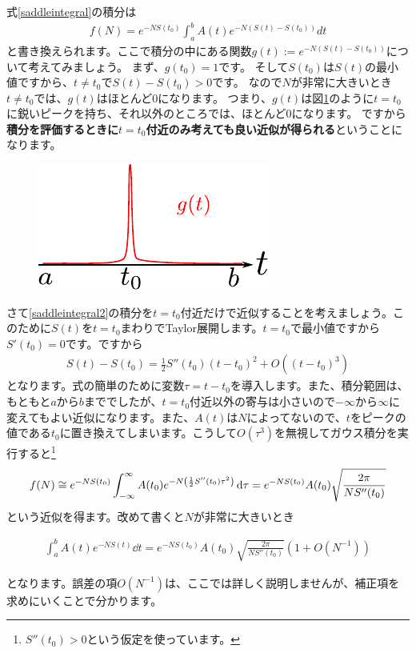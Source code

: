 \documentclass[report,paper=a4, fontsize=12pt, line_length=16cm, number_of_lines=33,dvipdfmx]{jlreq}
\newenvironment{important}{\begin{tcolorbox}[
  colback = white,
  colframe = red!35,
  boxrule = 2mm,
  fonttitle = \bfseries,
  after = \noindent] }{\end{tcolorbox}}
\numberwithin{equation}{section}
\newcommand{\strong}[1]{\textsf{\bfseries #1}}
\begin{document}
式\eqref{saddleintegral}の積分は
\begin{align}
  f(N)=e^{-NS(t_0)}\int_{a}^{b}A(t)e^{-N (S(t)-S(t_0))}dt\label{saddleintegral2}
\end{align}
と書き換えられます。ここで積分の中にある関数$g(t):=e^{-N (S(t)-S(t_0))}$について考えてみましょう。
まず、$g(t_0)=1$です。
そして$S(t_0)$は$S(t)$の最小値ですから、$t\ne t_0$で$S(t)-S(t_0)>0$です。
なので$N$が非常に大きいとき$t\ne t_0$では、$g(t)$はほとんど$0$になります。
つまり、$g(t)$は図\ref{fig:saddlefunction2}のように$t=t_0$に鋭いピークを持ち、それ以外のところでは、ほとんど$0$になります。
ですから\strong{積分を評価するときに$t=t_0$付近のみ考えても良い近似が得られる}ということになります。
\begin{figure}[htbp]
  \centering
  \includegraphics{saddlefunction2.pdf}
  \caption{}
  \label{fig:saddlefunction2}
\end{figure}

さて\eqref{saddleintegral2}の積分を$t=t_0$付近だけで近似することを考えましょう。このために$S(t)$を$t=t_0$まわりでTaylor展開します。$t=t_0$で最小値ですから$S'(t_0)=0$です。ですから
\begin{align}
  S(t)-S(t_0)=\frac12 S''(t_0) (t-t_0)^2+O((t-t_0)^3)
\end{align}
となります。式の簡単のために変数$\tau=t-t_0$を導入します。また、積分範囲は、もともと$a$から$b$まででしたが、$t=t_0$付近以外の寄与は小さいので$-\infty$から$\infty$に変えてもよい近似になります。また、$A(t)$は$N$によってないので、$t$をピークの値である$t_0$に置き換えてしまいます。こうして$O(\tau^3)$を無視してガウス積分を実行すると\footnote{$S''(t_0)>0$という仮定を使っています。}
\begin{align}
  f(N)\cong e^{-NS(t_0)}\int_{-\infty}^{\infty}A(t_0)e^{-N\qty( \frac12 S''(t_0) \tau^2)}\dd{\tau}
  =e^{-NS(t_0)}A(t_0)\sqrt{\frac{2\pi}{NS''(t_0)}}
\end{align}
という近似を得ます。改めて書くと$N$が非常に大きいとき
\begin{important}
  \begin{align}
    \int_{a}^{b}A(t)e^{-N S(t)}\dd{t}=e^{-NS(t_0)}A(t_0)\sqrt{\frac{2\pi}{NS''(t_0)}}(1+O(N^{-1}))
  \end{align}
\end{important}
となります。誤差の項$O(N^{-1})$は、ここでは詳しく説明しませんが、補正項を求めにいくことで分かります。
\end{document}
